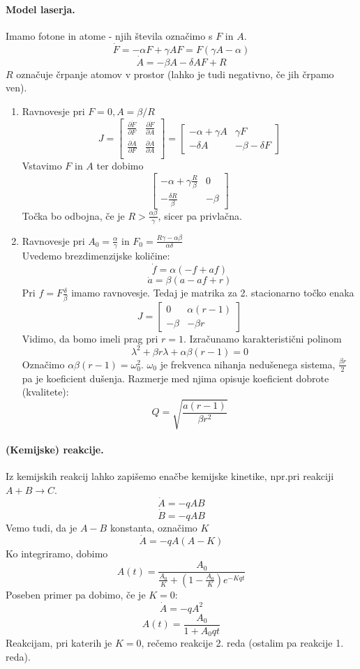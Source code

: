 \documentclass[a4paper]{article}
\newcommand{\pd}[2]{\frac{\partial {#1}}{\partial {#2}}}
\begin{document}
\paragraph{Model laserja.} Imamo fotone in atome - njih števila označimo s $F$ in $A$.
$$\dot F = - \alpha F + \gamma A F = F(\gamma A - \alpha)$$
$$\dot A = - \beta A - \delta AF + R$$
$R$ označuje črpanje atomov v prostor (lahko je tudi negativno, če jih črpamo ven).
\begin{enumerate}
    \item Ravnovesje pri $F=0, A = \beta/R$
    $$J = \begin{bmatrix}
        \pd{\dot F}{F} & \pd{\dot F}{A} \\
        \pd{\dot A}{F} & \pd{\dot A}{A} \\
    \end{bmatrix} = \begin{bmatrix}
        -\alpha + \gamma A & \gamma F \\
        - \delta A & -\beta - \delta F
    \end{bmatrix}$$
    Vstavimo $F$ in $A$ ter dobimo
    $$\begin{bmatrix}
        -\alpha + \gamma\frac{R}{\beta} & 0 \\
        -\frac{\delta R}{\beta} & -\beta
    \end{bmatrix}$$
    Točka bo odbojna, če je $R > \frac{\alpha \beta}{\gamma}$, sicer pa privlačna.
    \item Ravnovesje pri $A_0 = \frac{\alpha}{\gamma}$ in $F_0 = \frac{R\gamma - \alpha\beta}{\alpha\delta}$ \\
    Uvedemo brezdimenzijske količine:
    $$\dot f = \alpha(-f + af)$$
    $$\dot a = \beta(a - af + r)$$
    Pri $f = F\frac{\delta}{\beta}$ imamo ravnovesje. Tedaj je matrika za 2. stacionarno točko enaka
    $$J = \begin{bmatrix}
        0 & \alpha(r-1) \\
        -\beta & -\beta r
    \end{bmatrix}$$
    Vidimo, da bomo imeli prag pri $r=1$. Izračunamo karakteristični polinom
    $$\lambda^2 + \beta r \lambda + \alpha\beta (r-1) = 0$$
    Označimo $\alpha\beta(r-1) = \omega_0^2$. $\omega_0$ je frekvenca nihanja nedušenega sistema, $\frac{\beta r}{2}$ pa je koeficient dušenja.
    Razmerje med njima opisuje koeficient dobrote (kvalitete): $$Q = \sqrt{\frac{a(r-1)}{\beta r^2}}$$
\end{enumerate}
\paragraph{(Kemijske) reakcije.} Iz kemijskih reakcij lahko zapišemo enačbe kemijske kinetike, npr.pri reakciji $A + B \to C$.
$$\dot A = -q AB$$
$$\dot B = -q AB$$
Vemo tudi, da je $A - B$ konstanta, označimo $K$
$$\dot A = -qA(A - K)$$
Ko integriramo, dobimo $$A(t) = \frac{A_0}{\frac{A_0}{K}+\left(1 - \frac{A_0}{K}\right)e^{-Kqt}}$$
Poseben primer pa dobimo, če je $K = 0$:
$$\dot A = -qA^2$$
$$A(t) = \frac{A_0}{1 + A_0qt}$$
Reakcijam, pri katerih je $K=0$, rečemo reakcije 2. reda (ostalim pa reakcije 1. reda).
\end{document}
